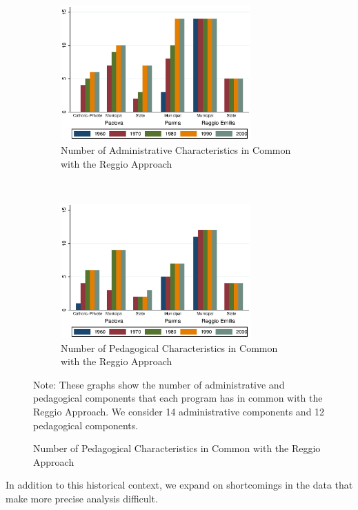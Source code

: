 \begin{figure}[H]
\begin{center}
\begin{subfigure}[b]{0.5\textwidth}
	\caption{Number of Administrative Characteristics in Common with the Reggio Approach}\label{fig:agg-admin}
	\includegraphics[width=0.8\textwidth]{../../output/aggregateAdministrative.eps}
\end{subfigure}%
~
\begin{subfigure}[b]{0.5\textwidth}
	\caption{Number of Pedagogical Characteristics in Common with the Reggio Approach}\label{fig:agg-ped}
	\includegraphics[width=0.8\textwidth]{../../output/aggregatePedagogical.eps}
\end{subfigure}%
\end{center}
\raggedright \footnotesize Note: These graphs show the number of administrative and pedagogical components that each program has in common with the Reggio Approach. We consider 14 administrative components and 12 pedagogical components. 
\end{figure}

In addition to this historical context, we expand on shortcomings in the data that make more precise analysis difficult.

